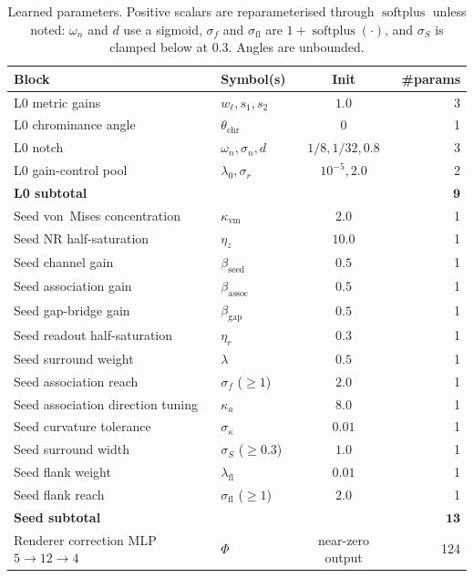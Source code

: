 \documentclass[11pt,a4paper]{article}
\newcommand{\softplus}{\operatorname{softplus}}
\begin{document}
\begin{table}[htbp]
\centering
\caption{Learned parameters. Positive scalars are reparameterised through $\softplus$ unless noted: $\omega_n$ and $d$ use a sigmoid, $\sigma_f$ and $\sigma_{\mathrm{fl}}$ are $1 + \softplus(\cdot)$, and $\sigma_S$ is clamped below at $0.3$. Angles are unbounded.}
\label{tab:learned-params}
\renewcommand{\arraystretch}{1.15}
\setlength{\tabcolsep}{3.5pt}
\begin{tabular}{llcr}
\toprule
Block & Symbol(s) & Init & \#params \\
\midrule
L0 metric gains & $w_\ell, s_1, s_2$ & $1.0$ & 3 \\
L0 chrominance angle & $\theta_{\mathrm{chr}}$ & $0$ & 1 \\
L0 notch & $\omega_n, \sigma_n, d$ & $1/8, 1/32, 0.8$ & 3 \\
L0 gain-control pool & $\lambda_0, \sigma_r$ & $10^{-5}, 2.0$ & 2 \\
\midrule
\multicolumn{3}{l}{\textbf{L0 subtotal}} & $\bm{9}$ \\
\midrule
Seed von~Mises concentration & $\kappa_{\mathrm{vm}}$ & $2.0$ & 1 \\
Seed NR half-saturation & $\eta_z$ & $10.0$ & 1 \\
Seed channel gain & $\beta_{\mathrm{seed}}$ & $0.5$ & 1 \\
Seed association gain & $\beta_{\mathrm{assoc}}$ & $0.5$ & 1 \\
Seed gap-bridge gain & $\beta_{\mathrm{gap}}$ & $0.5$ & 1 \\
Seed readout half-saturation & $\eta_r$ & $0.3$ & 1 \\
Seed surround weight & $\lambda$ & $0.5$ & 1 \\
Seed association reach & $\sigma_f$ ($\geq 1$) & $2.0$ & 1 \\
Seed association direction tuning & $\kappa_a$ & $8.0$ & 1 \\
Seed curvature tolerance & $\sigma_\kappa$ & $0.01$ & 1 \\
Seed surround width & $\sigma_S$ ($\geq 0.3$) & $1.0$ & 1 \\
Seed flank weight & $\lambda_{\mathrm{fl}}$ & $0.01$ & 1 \\
Seed flank reach & $\sigma_{\mathrm{fl}}$ ($\geq 1$) & $2.0$ & 1 \\
\midrule
\multicolumn{3}{l}{\textbf{Seed subtotal}} & $\bm{13}$ \\
\midrule
Renderer correction MLP $5\to 12\to 4$ & $\Phi$ & near-zero output & 124 \\

\end{tabular}
\end{table}
\end{document}
